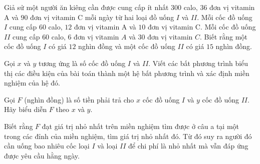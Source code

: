 \begin{bt}%
	Giả sử một người ăn kiêng cần được cung cấp ít nhất $300$ calo, $36$ đơn vị vitamin A và $90$ đơn vị vitamin C mỗi ngày từ hai loại đồ uống $I$ và $II$. Mỗi cốc đồ uống $I$ cung cấp $60$ calo, $12$ đơn vị vitamin A và $10$ đơn vị vitamin C. Mỗi cốc đồ uống $II$ cung cấp $60$ calo, $6$ đơn vị vitamin $A$ và $30$ đơn vị vitamin $C$. Biết rằng một cốc đồ uống $I$ có giá $12$ nghìn đồng và một cốc đồ uống $II$ có giá $15$ nghìn đồng.
	\begin{listEX}[1]
		\item Gọi $x$ và $y$ tương ứng là số cốc đồ uống $I$ và $II$. Viết các bất phương trình biểu thị các điều kiện của bài toán thành một hệ bất phương trình và xác định miền nghiệm của hệ đó.
		\item Gọi $F$ (nghìn đồng) là số tiền phải trả cho $x$ cốc đồ uống $I$ và $y$ cốc đồ uống $II$. Hãy biểu diễn $F$ theo $x$ và $y$.
		\item Biết rằng $F$ đạt giá trị nhỏ nhất trên miền nghiệm tìm được ở câu a tại một trong các đỉnh của miền nghiệm, tìm giá trị nhỏ nhất đó. Từ đó suy ra người đó cần uống bao nhiêu cốc loại $I$ và loại $II$ để chi phí là nhỏ nhất mà vẫn đáp ứng được yêu cầu hằng ngày.
	\end{listEX}
\end{bt}
